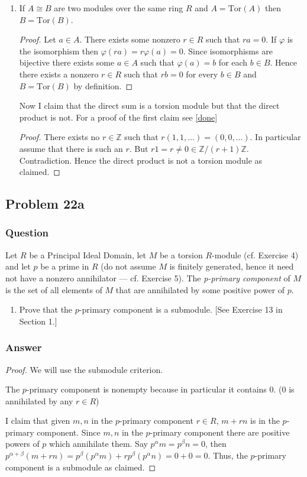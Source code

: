 \documentclass[12pt]{article}
\begin{document}
\begin{enumerate}
\item If $A \cong B$ are two modules over the same ring $R$ and $A = \mathrm{Tor}(A)$ then $B = \mathrm{Tor}(B)$. 
\begin{proof}
Let $a \in A$. There exists some nonzero $r \in R$ such that $ra=0$. If $\varphi$ is the isomorphism then $\varphi(ra)=r\varphi(a)=0$. Since isomorphisms are bijective there exists some $a \in A$ such that $\varphi(a)=b$ for each $b \in B$. Hence there exists a nonzero $ r \in R $ such that $r b = 0$ for every $b \in B$ and $B = \mathrm{Tor}(B)$ by definition.
\end{proof}

Now I claim that the direct sum is a torsion module but that the direct product is not. For a proof of the first claim see \ref{done}
\begin{proof}
There exists no $r \in \mathbb{Z}$ such that $r(1,1,\dots)=(0,0,\dots)$. In particular assume that there is such an $r$. But $r 1 = r \neq 0 \in \mathbb{Z}/(r+1)\mathbb{Z}$. Contradiction. Hence the direct product is not a torsion module as claimed.
\end{proof}

\end{enumerate}


\subsection{Problem 22a}
\subsubsection{Question}
Let $R$ be a Principal Ideal Domain, let $M$ be a torsion $R$-module (cf. Exercise 4) and let $p$ be a prime in $R$ (do not assume $M$ is finitely generated, hence it need not have a nonzero annihilator --- cf. Exercise 5). The \emph{p-primary component } of $M$ is the set of all elements of $M$ that are annihilated by some positive power of $p$.
\begin{enumerate}
\item Prove that the $p$-primary component is a submodule. [See Exercise 13 in Section 1.]
\end{enumerate}
\subsubsection{Answer}
\begin{proof}
We will use the submodule criterion. 

The $p$-primary component is nonempty because in particular it contains 0. (0 is annihilated by any $r \in R$)

I claim that given $m, n$ in the $p$-primary component $r \in R$, $m +r n$ is in the $p$-primary component. Since $m, n$ in the $p$-primary component there are positive powers of $p$ which annihilate them. Say $p^\alpha m = p^\beta n = 0$, then  $p^{\alpha+\beta}(m +r n)=p^\beta (p^\alpha m) + r p^\beta (p^{\alpha}n )= 0+0=0$. Thus, the $p$-primary component is a submodule as claimed.
\end{proof}
\end{document}

